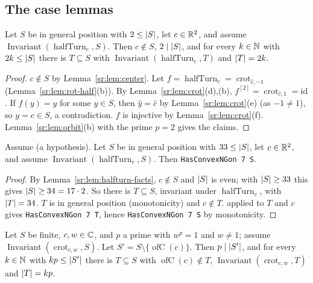 \subsection{The case lemmas}\label{sr:ssec:cases}

\begin{lemma}\label{sr:lem:halfturn-facts}
Let $S$ be in general position with $2\le\lvert S\rvert$, let $c\in\mathbb R^2$, and assume
$\operatorname{Invariant}(\operatorname{halfTurn}_c,S)$. Then $c\notin S$, $2\mid\lvert S\rvert$, and for every $k\in\mathbb N$ with
$2k\le\lvert S\rvert$ there is $T\subseteq S$ with $\operatorname{Invariant}(\operatorname{halfTurn}_c,T)$ and $\lvert T\rvert=2k$.
\end{lemma}

\begin{proof}
$c\notin S$ by Lemma~\ref{sr:lem:center}. Let $f=\operatorname{halfTurn}_c=\operatorname{crot}_{\hat c,-1}$
(Lemma~\ref{sr:lem:rot-half}(b)). By Lemma~\ref{sr:lem:crot}(d),(b), $f^{[2]}=\operatorname{crot}_{\hat c,1}=\mathrm{id}$.
If $f(y)=y$ for some $y\in S$, then $\hat y=\hat c$ by Lemma~\ref{sr:lem:crot}(e) (as $-1\ne1$), so $y=c\in S$, a
contradiction. $f$ is injective by Lemma~\ref{sr:lem:crot}(f). Lemma~\ref{sr:lem:orbit}(b) with the prime $p=2$ gives
the claims.
\end{proof}

\begin{lemma}\label{sr:lem:case-halfturn}
Assume  (a hypothesis). Let $S$ be in general position with $33\le\lvert S\rvert$, let $c\in\mathbb R^2$, and assume
$\operatorname{Invariant}(\operatorname{halfTurn}_c,S)$. Then \texttt{HasConvexNGon 7 S}.
\end{lemma}

\begin{proof}
By Lemma~\ref{sr:lem:halfturn-facts}, $c\notin S$ and $\lvert S\rvert$ is even; with $\lvert S\rvert\ge33$ this gives $\lvert S\rvert\ge34=17\cdot2$.
So there is $T\subseteq S$, invariant under $\operatorname{halfTurn}_c$, with $\lvert T\rvert=34$. $T$ is in general position
(monotonicity) and $c\notin T$.  applied to $T$ and $c$ gives \texttt{HasConvexNGon 7 T}, hence
\texttt{HasConvexNGon 7 S} by monotonicity.
\end{proof}

\begin{lemma}\label{sr:lem:rot-erase}
Let $S$ be finite, $c,w\in\mathbb C$, and $p$ a prime with $w^p=1$ and $w\ne1$; assume
$\operatorname{Invariant}(\operatorname{crot}_{c,w},S)$. Let $S'=S\setminus\{\operatorname{ofC}(c)\}$. Then
$p\mid\lvert S'\rvert$, and for every $k\in\mathbb N$ with $kp\le\lvert S'\rvert$ there is $T\subseteq S$ with
$\operatorname{ofC}(c)\notin T$, $\operatorname{Invariant}(\operatorname{crot}_{c,w},T)$ and $\lvert T\rvert=kp$.
\end{lemma}

